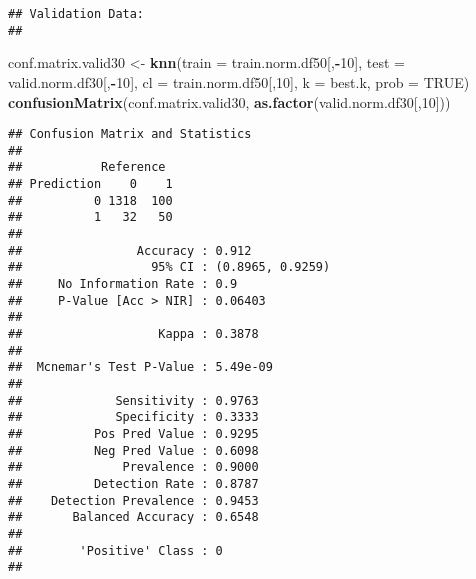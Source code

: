 \documentclass[
]{article}
\newenvironment{Shaded}{\begin{snugshade}}{\end{snugshade}}
\newcommand{\AttributeTok}[1]{\textcolor[rgb]{0.13,0.29,0.53}{#1}}
\newcommand{\ConstantTok}[1]{\textcolor[rgb]{0.56,0.35,0.01}{#1}}
\newcommand{\DecValTok}[1]{\textcolor[rgb]{0.00,0.00,0.81}{#1}}
\newcommand{\FunctionTok}[1]{\textcolor[rgb]{0.13,0.29,0.53}{\textbf{#1}}}
\newcommand{\NormalTok}[1]{#1}
\newcommand{\OtherTok}[1]{\textcolor[rgb]{0.56,0.35,0.01}{#1}}
\newcommand{\SpecialCharTok}[1]{\textcolor[rgb]{0.81,0.36,0.00}{\textbf{#1}}}
\begin{document}
\begin{verbatim}
## Validation Data: 
## 
\end{verbatim}

\begin{Shaded}
\begin{Highlighting}[]
\NormalTok{conf.matrix.valid30 }\OtherTok{\textless{}{-}} \FunctionTok{knn}\NormalTok{(}\AttributeTok{train =}\NormalTok{ train.norm.df50[,}\SpecialCharTok{{-}}\DecValTok{10}\NormalTok{], }\AttributeTok{test =}\NormalTok{ valid.norm.df30[,}\SpecialCharTok{{-}}\DecValTok{10}\NormalTok{], }\AttributeTok{cl =}\NormalTok{ train.norm.df50[,}\DecValTok{10}\NormalTok{], }\AttributeTok{k =}\NormalTok{ best.k, }\AttributeTok{prob =} \ConstantTok{TRUE}\NormalTok{)}
\FunctionTok{confusionMatrix}\NormalTok{(conf.matrix.valid30, }\FunctionTok{as.factor}\NormalTok{(valid.norm.df30[,}\DecValTok{10}\NormalTok{]))}
\end{Highlighting}
\end{Shaded}

\begin{verbatim}
## Confusion Matrix and Statistics
## 
##           Reference
## Prediction    0    1
##          0 1318  100
##          1   32   50
##                                           
##                Accuracy : 0.912           
##                  95% CI : (0.8965, 0.9259)
##     No Information Rate : 0.9             
##     P-Value [Acc > NIR] : 0.06403         
##                                           
##                   Kappa : 0.3878          
##                                           
##  Mcnemar's Test P-Value : 5.49e-09        
##                                           
##             Sensitivity : 0.9763          
##             Specificity : 0.3333          
##          Pos Pred Value : 0.9295          
##          Neg Pred Value : 0.6098          
##              Prevalence : 0.9000          
##          Detection Rate : 0.8787          
##    Detection Prevalence : 0.9453          
##       Balanced Accuracy : 0.6548          
##                                           
##        'Positive' Class : 0               
## 
\end{verbatim}
\end{document}
